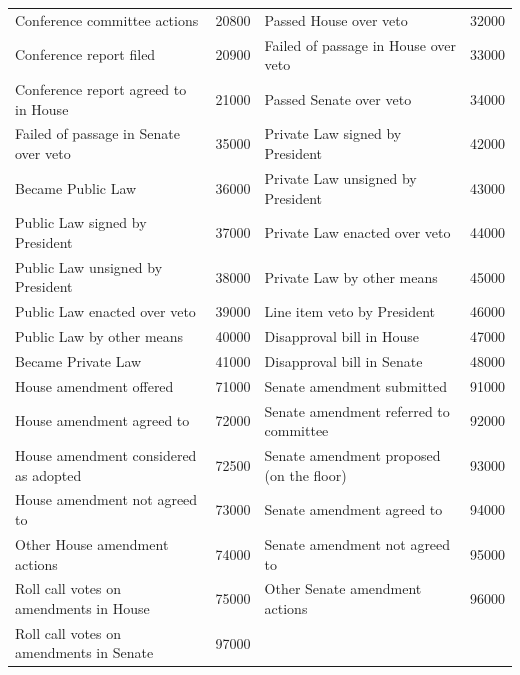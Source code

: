 \documentclass[letterpaper,11pt]{article}
\begin{document}
\begin{table}[!h]
\begin{tabular}{ll|ll}
Conference committee actions & 20800 & Passed House over veto & 32000 \\
Conference report filed & 20900 & Failed of passage in House over veto & 33000 \\
Conference report agreed to in House & 21000 & Passed Senate over veto & 34000 \\
Failed of passage in Senate over veto & 35000 & Private Law signed by President & 42000 \\
Became Public Law & 36000 & Private Law unsigned by President & 43000 \\
Public Law signed by President & 37000 & Private Law enacted over veto & 44000 \\
Public Law unsigned by President & 38000 & Private Law by other means & 45000 \\
Public Law enacted over veto & 39000 & Line item veto by President & 46000 \\
Public Law by other means & 40000 & Disapproval bill in House & 47000 \\
Became Private Law & 41000 & Disapproval bill in Senate & 48000 \\
House amendment offered & 71000 & Senate amendment submitted & 91000 \\
House amendment agreed to & 72000 & Senate amendment referred to committee & 92000 \\
House amendment considered as adopted & 72500 & Senate amendment proposed (on the floor) & 93000 \\
House amendment not agreed to & 73000 & Senate amendment agreed to & 94000 \\
Other House amendment actions & 74000 & Senate amendment not agreed to & 95000 \\
Roll call votes on amendments in House & 75000 & Other Senate amendment actions & 96000 \\
Roll call votes on amendments in Senate & 97000 & & \\
\hline
\end{tabular}
\end{table}




\clearpage


\printbibliography
\end{document}
